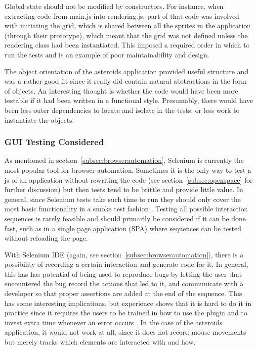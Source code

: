 \documentclass[11pt]{article}
\begin{document}
Global state should not be modified by constructors. For instance, when extracting code from main.js into rendering.js, part of that code was involved with initiating the grid, which is shared between all the sprites in the application (through their prototype), which meant that the grid was not defined unless the rendering class had been instantiated. This imposed a required order in which to run the tests and is an example of poor maintainability and design.

The object orientation of the asteroids application provided useful structure and was a rather good fit since it really did contain natural abstractions in the form of objects. An interesting thought is whether the code would have been more testable if it had been written in a functional style. Presumably, there would have been less outer dependencies to locate and isolate in the tests, or less work to instantiate the objects. \cite[question~26]{Ahnve}

\subsubsection{GUI Testing Considered}
\label{subsec:asteroids}

As mentioned in section~\ref{subsec:browserautomation}, Selenium is currently the most popular tool for browser automation. Sometimes it is the only way to test a \gls{js} of an application without rewriting the code \cite[question~43]{Stenmark} (see section~\ref{subsec:openspace} for further discussion) but then tests tend to be brittle and provide little value. In general, since Selenium tests take such time to run they should only cover the most basic functionality in a smoke test fashion \cite[questions~16-17]{Stenmark}\cite[question~21]{Ahnve}. Testing all possible interaction sequences is rarely feasible and should primarily be considered if it can be done fast, such as in a single page application (SPA) where sequences can be tested without reloading the page. \cite[question~44]{Edelstam}

With Selenium IDE (again, see section~\ref{subsec:browserautomation}), there is a possibility of recording a certain interaction and generate code for it. In general, this has has potential of being used to reproduce bugs by letting the user that encountered the bug record the actions that led to it, and communicate with a developer so that proper assertions are added at the end of the sequence. This has some interesting implications, but experience shows that it is hard to do it in practice since it requires the users to be trained in how to use the plugin and to invest extra time whenever an error occurs \cite[questions~42-43]{Edelstam}. In the case of the asteroids application, it would not work at all, since it does not record mouse movements but merely tracks which elements are interacted with and how.
\end{document}
